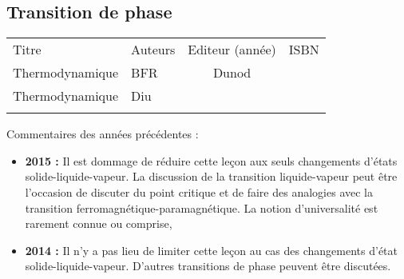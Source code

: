 \begin{headerBlock}
  \chapter{Transition de phase}
  \label{LP_TransitionPhase} 
\end{headerBlock}




\begin{center}
\begin{tabularx}{\textwidth}{| X | X | c | c |}
  \hline
  \rowcolor{gray!20}\multicolumn{4}{c}{Bibliographie de la leçon : } \\
  \hline 
  Titre & Auteurs & Editeur (année) & ISBN \\
  \hline
  Thermodynamique & BFR & Dunod & \\
  \hline 
  Thermodynamique & Diu &  &    \\
  \hline 
   &  & &    \\
  \hline 
\end{tabularx}
\end{center}

\begin{reportBlock}{Commentaires des années précédentes :}
    \begin{itemize}
        \item \textbf{2015 :} Il est dommage de réduire cette leçon aux seuls changements d’états solide-liquide-vapeur. La discussion de la transition liquide-vapeur peut être l’occasion de discuter du point critique et de faire des analogies avec la transition ferromagnétique-paramagnétique. La notion d’universalité est rarement connue ou comprise,
        \item \textbf{2014 :} Il n’y a pas lieu de limiter cette leçon au cas des changements d’état solide-liquide-vapeur. D’autres transitions de phase peuvent être discutées.
    \end{itemize}
\end{reportBlock}


